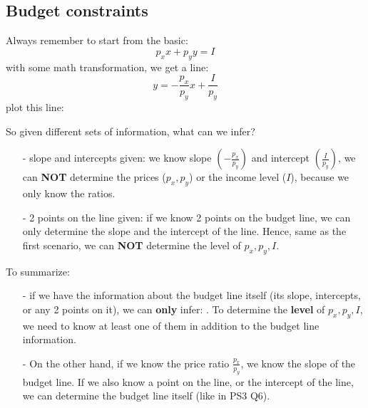 \documentclass[twoside]{article}
\theoremstyle{definition}
\begin{document}
\subsection{Budget constraints}
Always remember to start from the basic:
$$
p_x x + p_y y = I
$$
with some math transformation, we get a line:
$$
y = -\frac{p_x}{p_y} x + \frac{I}{p_y}
$$
plot this line:
\begin{center}
\end{center}

So given different sets of information, what can we infer?
\begin{itemize}
    \item[-] slope and intercepts given: we know slope $\left(-\frac{p_x}{p_y}\right)$ and intercept $\left(\frac{I}{p_y}\right)$, we can \textbf{NOT} determine the prices ($p_x,p_y$) or the income level ($I$), because we only know the ratios.
    \item[-] 2 points on the line given: if we know 2 points on the budget line, we can only determine the slope and the intercept of the line. Hence, same as the first scenario, we can \textbf{NOT} determine the level of $p_x,p_y,I$.
\end{itemize}

To summarize: 
\begin{itemize}
    \item[-] if we have the information about the budget line itself (its slope, intercepts, or any 2 points on it), we can \textbf{only} infer: . To determine the \textbf{level} of $p_x,p_y,I$, we need to know at least one of them in addition to the budget line information.
    \item[-] On the other hand, if we know the price ratio $\frac{p_x}{p_y}$, we know the slope of the budget line. If we also know a point on the line, or the intercept of the line, we can determine the budget  line itself (like in PS3 Q6).
\end{itemize}
\end{document}
